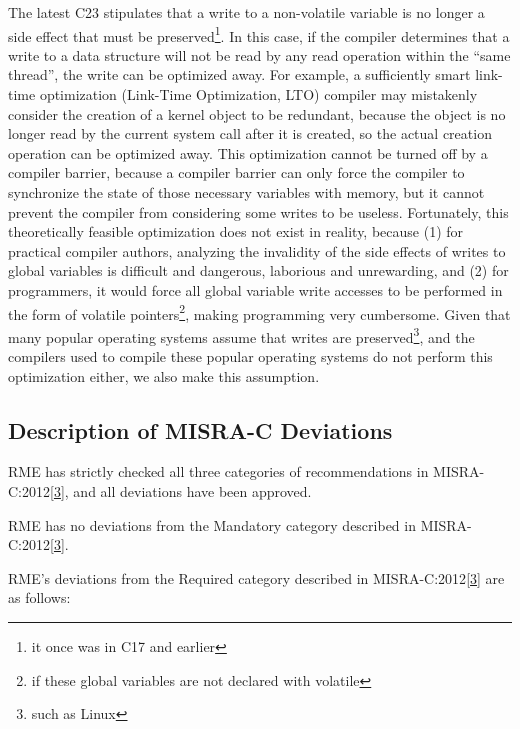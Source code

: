 The latest C23 stipulates that a write to a non-volatile variable is no longer a side effect that must be preserved\footnote{it once was in C17 and earlier}. In this case, if the compiler determines that a write to a data structure will not be read by any read operation within the ``same thread'', the write can be optimized away. For example, a sufficiently smart link-time optimization (Link-Time
  Optimization, LTO) compiler may mistakenly consider the creation of a kernel object to be redundant, because the object is no longer read by the current system call after it is created, so the actual creation operation can be optimized away. This optimization cannot be turned off by a compiler barrier, because a compiler barrier can only force the compiler to synchronize the state of those necessary variables with memory, but it cannot prevent the compiler from considering some writes to be useless. Fortunately, this theoretically feasible optimization does not exist in reality, because (1) for practical compiler authors, analyzing the invalidity of the side effects of writes to global variables is difficult and dangerous, laborious and unrewarding, and (2) for programmers, it would force all global variable write accesses to be performed in the form of volatile pointers\footnote{if these global variables are not declared with volatile}, making programming very cumbersome. Given that many popular operating systems assume that writes are preserved\footnote{such as Linux}, and the compilers used to compile these popular operating systems do not perform this optimization either, we also make this assumption.

\subsection{Description of MISRA-C Deviations}\label{subsec:9-misra-c-deviations}

RME has strictly checked all three categories of recommendations in MISRA-C:2012\hyperref[cite:9-3]{{[}3{]}}, and all deviations have been approved.

RME has no deviations from the Mandatory category described in MISRA-C:2012\hyperref[cite:9-3]{{[}3{]}}.

RME's deviations from the Required category described in MISRA-C:2012\hyperref[cite:9-3]{{[}3{]}} are as follows:

